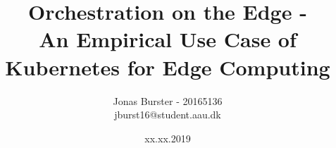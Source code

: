 \pagestyle{fancy}
\fancyhf{}
\title{Orchestration on the Edge -\\ An Empirical Use Case of Kubernetes for Edge Computing}
\author{Jonas Burster - 20165136\\jburst16@student.aau.dk}

\date{xx.xx.2019}
\pagestyle{fancy}
\makeatletter
\let\runtitle\@title
\let\runauthor\@author
\makeatother
\lhead{\runtitle}

